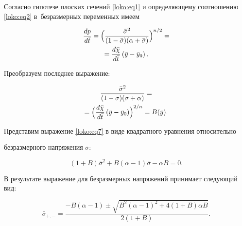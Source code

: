 Согласно гипотезе плоских сечений \eqref{loko:eq1} и определяющему соотношению \eqref{loko:eq2} в~безразмерных переменных имеем

\begin{multline}

\label{loko:eq6}

\frac{dp}{d\bar {t}}=\Bigl( \frac{\bar {\sigma}^2}{(1-\bar {\sigma

}) ( \alpha +\bar {\sigma })}\Bigr)^{{n}/{2}}= \\ = \frac{d\bar

{\chi }}{d\bar {t}} \left(\bar {y}-\bar {y}_0 \right).

\end{multline}

Преобразуем последнее выражение: 

\begin{multline}

\label{loko:eq7}

\frac{\bar {\sigma }^2}{(1-\bar {\sigma }) (\bar {\sigma }+\alpha )} = \\ =\Bigl( \frac{d\bar {\chi

}}{d\bar {t}} \left( \bar {y}-\bar {y}_0 \right)\Bigr)^{{2}/{n}}=  B(\bar

{y}).

\end{multline}

Представим выражение \eqref{loko:eq7} в виде квадратного уравнения относительно

безразмерного напряжения $\bar {\sigma}$:

\begin{equation}

\label{loko:eq8}

(1+B) \bar {\sigma}^2 + B(\alpha -1) \bar {\sigma }-\alpha B=0.

\end{equation}

В результате выражение для безразмерных напряжений принимает следующий вид:

\begin{equation}

\label{loko:eq9}

\bar {\sigma}_{+,-} =\frac{-B(\alpha -1)\pm \sqrt {B^2(\alpha -1)^2+4(1+B)\alpha B} }{2 (1+B)}.

\end{equation}







